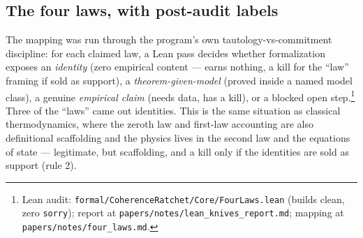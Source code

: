 \documentclass[11pt,a4paper]{article}
\begin{document}
\subsection*{The four laws, with post-audit labels}

The mapping was run through the program's own tautology-vs-commitment discipline: for each claimed law, a Lean pass decides whether formalization exposes an \emph{identity} (zero empirical content --- earns nothing, a kill for the ``law'' framing if sold as support), a \emph{theorem-given-model} (proved inside a named model class), a genuine \emph{empirical claim} (needs data, has a kill), or a blocked open step.\footnote{Lean audit: \texttt{formal/CoherenceRatchet/Core/FourLaws.lean} (builds clean, zero \texttt{sorry}); report at \texttt{papers/notes/lean\_knives\_report.md}; mapping at \texttt{papers/notes/four\_laws.md}.} Three of the ``laws'' came out identities. This is the same situation as classical thermodynamics, where the zeroth law and first-law accounting are also definitional scaffolding and the physics lives in the second law and the equations of state --- legitimate, but scaffolding, and a kill only if the identities are sold as support (rule 2).
\end{document}
